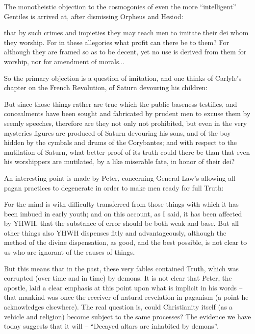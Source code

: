 The monotheistic objection to the cosmogonies of even the more ``intelligent'' Gentiles is arrived at, after dismissing Orpheus and Hesiod:

\begin{quotex}
that by such crimes and impieties they may teach men to imitate their dei whom they worship. For in these allegories what profit can there be to them? For although they are framed so as to be decent, yet no use is derived from them for worship, nor for amendment of morals... 
\end{quotex}


So the primary objection is a question of imitation, and one thinks of Carlyle's chapter on the French Revolution, of Saturn devouring his children:

\begin{quotex}
But since those things rather are true which the public baseness testifies, and concealments have been sought and fabricated by prudent men to excuse them by seemly speeches, therefore are they not only not prohibited, but even in the very mysteries figures are produced of Saturn devouring his sons, and of the boy hidden by the cymbals and drums of the Corybantes; and with respect to the mutilation of Saturn, what better proof of its truth could there be than that even his worshippers are mutilated, by a like miserable fate, in honor of their dei?
\end{quotex}


An interesting point is made by Peter, concerning General Law's allowing all pagan practices to degenerate in order to make men ready for full Truth:

\begin{quotex}
For the mind is with difficulty transferred from those things with which it has been imbued in early youth; and on this account, as I said, it has been affected by YHWH, that the substance of error should be both weak and base. But all other things also YHWH dispenses fitly and advantageously, although the method of the divine dispensation, as good, and the best possible, is not clear to us who are ignorant of the causes of things.
\end{quotex}


But this means that in the past, these very fables contained Truth, which was corrupted (over time and in time) by demons. It is not clear that Peter, the apostle, laid a clear emphasis at this point upon what is implicit in his words -- that mankind was once the receiver of natural revelation in paganism (a point he acknowledges elsewhere). The real question is, could Christianity itself (as a vehicle and religion) become subject to the same processes? The evidence we have today suggests that it will -- ``Decayed altars are inhabited by demons''.

